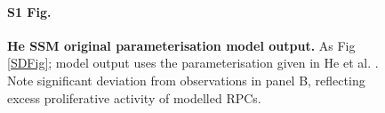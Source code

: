 \documentclass{ut-thesis}
\begin{document}
\begin{NoHyper}
\begin{figure}[p]
\paragraph{S1 Fig.}
\label{originalSupplement}
{\bf He SSM original parameterisation model output.} As Fig \ref{SDFig}; model output uses the parameterisation given in He et al. \cite{He2012}. Note significant deviation from observations in panel B, reflecting excess proliferative activity of modelled RPCs.
\end{figure}


\end{NoHyper}
\end{document}
